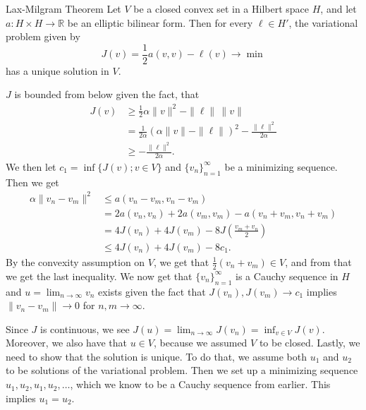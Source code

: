 \begin{thmx}{Lax-Milgram Theorem}
Let $V$ be a closed convex set in a Hilbert space $H$, and let $a:H \times H \rightarrow \mathbb{R}$ be an elliptic bilinear form. Then for every $\ell\in H'$, the variational problem given by
\[
    J(v)=\frac{1}{2} a(v,v) - \ell(v) \longrightarrow \min    
\]
has a unique solution in $V$.
\label{thm:lax_milgram}
\end{thmx}

\begin{bev}
    $J$ is bounded from below given the fact, that
    \begin{align*}
        J(v) &\geq \frac{1}{2} \alpha \|v\|^2 - \|\ell\| \, \|v\|\\
        &= \frac{1}{2\alpha} {(\alpha \|v\|-\|\ell\|)}^2 - \frac{\|\ell\|^2}{2\alpha} \\
        &\geq - \frac{\|\ell\|^2}{2\alpha}.
    \end{align*}
    We then let $c_1 = \inf\{J(v); v \in V\}$ and $\{v_n \}_{n=1}^\infty$ be a minimizing sequence. Then we get 
    \begin{align*}
        \alpha \|v_n-v_m\|^2 &\leq a(v_n-v_m,v_n-v_m) \\
        &= 2a(v_n,v_n) + 2a(v_m,v_m) - a (v_n+v_m,v_n+v_m) \\
        &= 4J(v_n) + 4J(v_m) - 8J(\frac{v_m+v_n}{2}) \\
        &\leq 4J(v_n) + 4J(v_m) - 8c_1. 
    \end{align*}
    By the convexity assumption on $V$, we get that $\frac{1}{2}(v_n + v_m) \in V$, and from that we get the last 
    inequality.
    We now get that $\{v_n \}_{n=1}^\infty$ is a Cauchy sequence in $H$ and $u = \lim_{n\rightarrow \infty}v_n$ exists given the fact that $J(v_n),J(v_m)\rightarrow c_1$ implies $\|v_n - v_m\| \rightarrow 0$ for $n,m\rightarrow \infty$.  

    Since $J$ is continuous,
    we see $J(u) = \lim_{n\rightarrow \infty} J(v_n) = \inf_{v\in V} J(v)$.
     Moreover, we also have that $u\in V$, because we assumed $V$ to be closed. 
    Lastly, we need to show that the solution is unique.
     To do that, we assume both $u_1$ and $u_2$ to be solutions of the variational problem. 
    Then we set up a minimizing sequence $u_1,u_2,u_1,u_2,\ldots$, which we know to be a Cauchy sequence from earlier.
     This implies $u_1 = u_2$.
\end{bev}